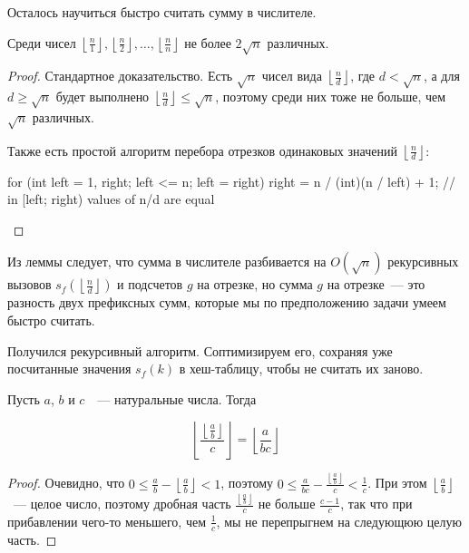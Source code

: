Осталось научиться быстро считать сумму в числителе.

\begin{lemma}
    Среди чисел $\left\lfloor \frac{n}{1} \right\rfloor, \left\lfloor \frac{n}{2} \right\rfloor, \ldots, 
    \left\lfloor \frac{n}{n} \right\rfloor$ не более $2 \sqrt{n}$ различных.
\end{lemma}

\begin{proof}
    Стандартное доказательство. Есть $\sqrt{n}$ чисел вида $\left\lfloor \frac{n}{d} \right\rfloor$, где $d < \sqrt{n}$,
    а для $d \ge \sqrt{n}$ будет выполнено $\left\lfloor \frac{n}{d} \right\rfloor \le \sqrt{n}$, поэтому
    среди них тоже не больше, чем $\sqrt{n}$ различных.

    Также есть простой алгоритм перебора отрезков одинаковых значений $\left\lfloor \frac{n}{d} \right\rfloor$:

\begin{code}
for (int left = 1, right; left <= n; left = right) {
    right = n / (int)(n / left) + 1;
    // in [left; right) values of n/d are equal
}
\end{code}

\end{proof}


Из леммы следует, что сумма в числителе разбивается на $O(\sqrt{n})$ рекурсивных вызовов
$s_f(\left\lfloor \frac{n}{d} \right\rfloor)$ и подсчетов $g$ на отрезке, но сумма $g$ на отрезке~--- это разность
двух префиксных сумм, которые мы по предположению задачи умеем быстро считать.

Получился рекурсивный алгоритм. Соптимизируем его, сохраняя уже посчитанные значения $s_f(k)$ в хеш-таблицу,
чтобы не считать их заново.

\begin{lemma}
    Пусть $a$, $b$ и $c$~~--- натуральные числа. Тогда

    $$\left\lfloor \frac{\left\lfloor \frac{a}{b} \right\rfloor}{c} \right\rfloor = \left\lfloor \frac{a}{bc} \right\rfloor$$
\end{lemma}

\begin{proof}
    Очевидно, что $0 \le \frac{a}{b} - \left\lfloor \frac{a}{b} \right\rfloor < 1$,
    поэтому $0 \le \frac{a}{bc} - \frac{\left\lfloor \frac{a}{b} \right\rfloor}{c} < \frac{1}{c}$.
    При этом $\left\lfloor \frac{a}{b} \right\rfloor$~--- целое число, поэтому
    дробная часть $\frac{\left\lfloor \frac{a}{b} \right\rfloor}{c}$ не больше $\frac{c - 1}{c}$, так что при прибавлении
    чего-то меньшего, чем $\frac{1}{c}$, мы не перепрыгнем на следующюю целую часть.
\end{proof}


